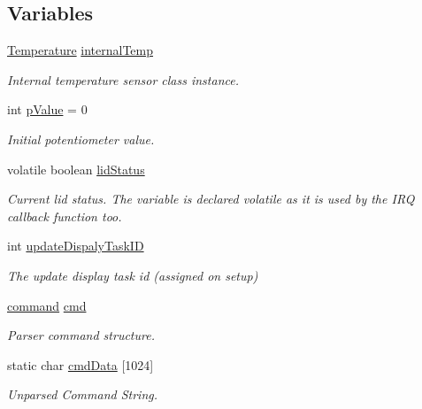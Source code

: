 \subsection*{Variables}
\begin{DoxyCompactItemize}
\item 
\hyperlink{class_temperature}{Temperature} \hyperlink{_meditech___chip_kit_control_panel_8pde_adcfca3504612462229db71750def77f9}{internal\-Temp}
\begin{DoxyCompactList}\small\item\em Internal temperature sensor class instance. \end{DoxyCompactList}\item 
int \hyperlink{_meditech___chip_kit_control_panel_8pde_a3134d7e85042180eb421c3f6ee88d3b3}{p\-Value} = 0
\begin{DoxyCompactList}\small\item\em Initial potentiometer value. \end{DoxyCompactList}\item 
volatile boolean \hyperlink{_meditech___chip_kit_control_panel_8pde_adea51712174a5f82a31231a67e0d4608}{lid\-Status}
\begin{DoxyCompactList}\small\item\em Current lid status. The variable is declared volatile as it is used by the I\-R\-Q callback function too. \end{DoxyCompactList}\item 
int \hyperlink{_meditech___chip_kit_control_panel_8pde_a527a89c41abb1d8660b53f5e727e655c}{update\-Dispaly\-Task\-I\-D}
\begin{DoxyCompactList}\small\item\em The update display task id (assigned on setup) \end{DoxyCompactList}\item 
\hyperlink{_command_processor_8h_a9e0992eae3950adccaf4847fbff4231d}{command} \hyperlink{_meditech___chip_kit_control_panel_8pde_a9ec7ba7a86dba057afdae246ca1ac40e}{cmd}
\begin{DoxyCompactList}\small\item\em Parser command structure. \end{DoxyCompactList}\item 
static char \hyperlink{_meditech___chip_kit_control_panel_8pde_afd31a444e0380e6be247c64cdb1510a9}{cmd\-Data} \mbox{[}1024\mbox{]}
\begin{DoxyCompactList}\small\item\em Unparsed Command String. \end{DoxyCompactList}\end{DoxyCompactItemize}


